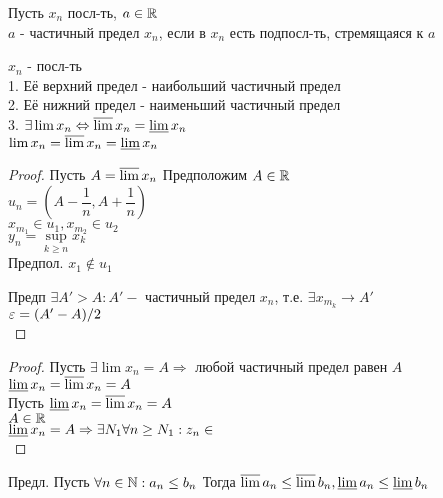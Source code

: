 \begin{definition}
	Пусть $ x_n $ посл-ть, $ a \in \mathbb{R} $ \\
	$ a $ - частичный предел $ x_n $, если в $ x_n $ есть подпосл-ть, стремящаяся к $ a $ \\
	\begin{theorem}
		$ x_n $ - посл-ть \\
		1. Её верхний предел - наибольший частичный предел \\
		2. Её нижний предел - наименьший частичный предел \\
		3. $ \exists \lim x_n \Leftrightarrow \varlimsup x_n = \varliminf x_n $ \\
		$  \lim x_n =  \varlimsup x_n = \varliminf x_n $ 
		\begin{proof}
			Пусть $ A = \varlimsup x_n $ Предположим $ A \in \mathbb{R} $\\
			$ u_n = \left( A - \dfrac{1}{n}, A + \dfrac{1}{n} \right) $ \\
			$ x_{m_1} \in u_1, x_{m_2} \in u_2 $ \\
			$ y_n = \sup\limits_{k \geq n} x_k $ \\
			Предпол. $ x_1 \notin u_1 $ %
			
			Предп $ \exists A' > A : A' - $ частичный предел $ x_n $, т.е. $ \exists x_{m_k} \rightarrow A' $ \\
			$ \varepsilon = (A' - A) / 2 $ \\
		\end{proof}
		\begin{proof}
			Пусть $ \exists \lim x_n = A \Rightarrow $ любой частичный предел равен $ A $  \\
			$ \varliminf x_n = \varlimsup x_n = A $\\
			Пусть $ \varliminf x_n = \varlimsup x_n = A $ \\
			$ A \in \mathbb{R} $ \\
			$ \varliminf x_n = A \Rightarrow \exists N_1 \forall n \geq N_1 : z_n \in  $ \\%
		\end{proof}
	\end{theorem}
\end{definition}
Предл. Пусть $ \forall n \in \mathbb{N} : a_n \leq b_n $ Тогда $\varlimsup a_n \leq \varlimsup b_n, \varliminf a_n \leq \varliminf b_n $ \\
